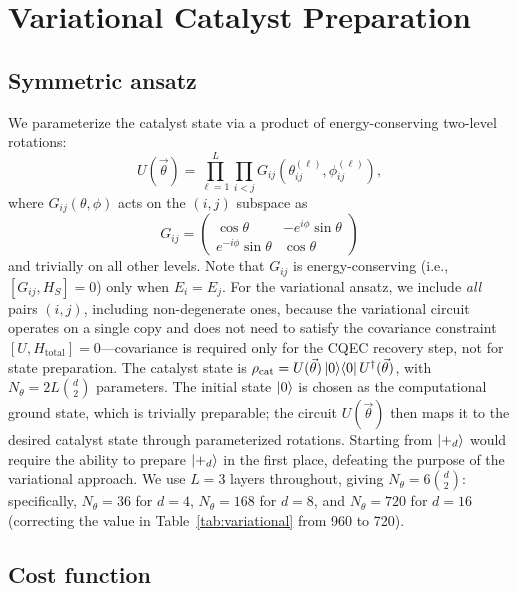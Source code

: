 \documentclass[prx,twocolumn,superscriptaddress,longbibliography,floatfix]{revtex4-2}
\begin{document}
\section{Variational Catalyst Preparation}
\label{sec:variational}

\subsection{Symmetric ansatz}
\label{sec:ansatz}

We parameterize the catalyst state via a product of energy-conserving two-level rotations:
\begin{equation}
U(\vec\theta) = \prod_{\ell=1}^{L} \prod_{i < j} G_{ij}(\theta_{ij}^{(\ell)}, \phi_{ij}^{(\ell)}),
\label{eq:ansatz}
\end{equation}
where $G_{ij}(\theta, \phi)$ acts on the $(i, j)$ subspace as
\begin{equation}
G_{ij} = \begin{pmatrix} \cos\theta & -e^{i\phi}\sin\theta \\ e^{-i\phi}\sin\theta & \cos\theta \end{pmatrix}
\label{eq:ec_rotation}
\end{equation}
and trivially on all other levels.
Note that $G_{ij}$ is energy-conserving (i.e., $[G_{ij}, H_S] = 0$) only when $E_i = E_j$. For the variational ansatz, we include \emph{all} pairs $(i,j)$, including non-degenerate ones, because the variational circuit operates on a single copy and does not need to satisfy the covariance constraint $[U, H_\mathrm{total}] = 0$---covariance is required only for the CQEC recovery step, not for state preparation.
The catalyst state is $\rho_\mathrm{cat} = U(\vec\theta)\ket{0}\!\bra{0}U^\dagger(\vec\theta)$, with $N_\theta = 2L\binom{d}{2}$ parameters.
The initial state $\ket{0}$ is chosen as the computational ground state, which is trivially preparable; the circuit $U(\vec\theta)$ then maps it to the desired catalyst state through parameterized rotations.
Starting from $\ket{+_d}$ would require the ability to prepare $\ket{+_d}$ in the first place, defeating the purpose of the variational approach.
We use $L = 3$ layers throughout, giving $N_\theta = 6\binom{d}{2}$: specifically, $N_\theta = 36$ for $d = 4$, $N_\theta = 168$ for $d = 8$, and $N_\theta = 720$ for $d = 16$ (correcting the value in Table~\ref{tab:variational} from 960 to 720).

\subsection{Cost function}
\label{sec:cost}
\end{document}
